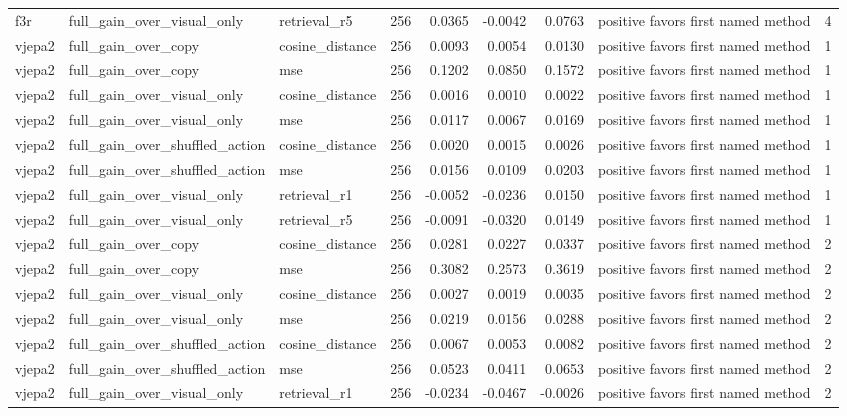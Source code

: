 \begin{tabular}{lllrrrrlr}
f3r & full\_gain\_over\_visual\_only & retrieval\_r5 & 256 & 0.0365 & -0.0042 & 0.0763 & positive favors first named method & 4 \\
vjepa2 & full\_gain\_over\_copy & cosine\_distance & 256 & 0.0093 & 0.0054 & 0.0130 & positive favors first named method & 1 \\
vjepa2 & full\_gain\_over\_copy & mse & 256 & 0.1202 & 0.0850 & 0.1572 & positive favors first named method & 1 \\
vjepa2 & full\_gain\_over\_visual\_only & cosine\_distance & 256 & 0.0016 & 0.0010 & 0.0022 & positive favors first named method & 1 \\
vjepa2 & full\_gain\_over\_visual\_only & mse & 256 & 0.0117 & 0.0067 & 0.0169 & positive favors first named method & 1 \\
vjepa2 & full\_gain\_over\_shuffled\_action & cosine\_distance & 256 & 0.0020 & 0.0015 & 0.0026 & positive favors first named method & 1 \\
vjepa2 & full\_gain\_over\_shuffled\_action & mse & 256 & 0.0156 & 0.0109 & 0.0203 & positive favors first named method & 1 \\
vjepa2 & full\_gain\_over\_visual\_only & retrieval\_r1 & 256 & -0.0052 & -0.0236 & 0.0150 & positive favors first named method & 1 \\
vjepa2 & full\_gain\_over\_visual\_only & retrieval\_r5 & 256 & -0.0091 & -0.0320 & 0.0149 & positive favors first named method & 1 \\
vjepa2 & full\_gain\_over\_copy & cosine\_distance & 256 & 0.0281 & 0.0227 & 0.0337 & positive favors first named method & 2 \\
vjepa2 & full\_gain\_over\_copy & mse & 256 & 0.3082 & 0.2573 & 0.3619 & positive favors first named method & 2 \\
vjepa2 & full\_gain\_over\_visual\_only & cosine\_distance & 256 & 0.0027 & 0.0019 & 0.0035 & positive favors first named method & 2 \\
vjepa2 & full\_gain\_over\_visual\_only & mse & 256 & 0.0219 & 0.0156 & 0.0288 & positive favors first named method & 2 \\
vjepa2 & full\_gain\_over\_shuffled\_action & cosine\_distance & 256 & 0.0067 & 0.0053 & 0.0082 & positive favors first named method & 2 \\
vjepa2 & full\_gain\_over\_shuffled\_action & mse & 256 & 0.0523 & 0.0411 & 0.0653 & positive favors first named method & 2 \\
vjepa2 & full\_gain\_over\_visual\_only & retrieval\_r1 & 256 & -0.0234 & -0.0467 & -0.0026 & positive favors first named method & 2 \\

\end{tabular}
